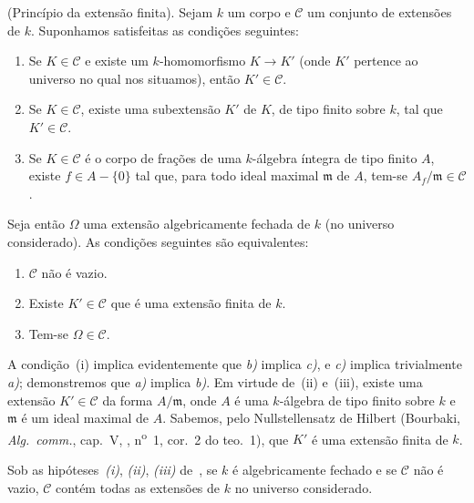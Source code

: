 \begin{proposition}[9.1.1]
\label{IV.9.1.1}
\textnormal{(Princípio da extensão finita).}
Sejam $k$ um corpo e $\mathcal{C}$ um conjunto de extensões de $k$.
Suponhamos satisfeitas as condições seguintes:
\begin{enumerate}[label=(\roman*)]
  \item Se $K\in\mathcal{C}$ e existe um $k$-homomorfismo $K\to K'$ (onde $K'$ pertence ao universo no qual nos situamos), então $K'\in\mathcal{C}$.
  \item Se $K\in\mathcal{C}$, existe uma subextensão $K'$ de $K$, de tipo finito sobre $k$, tal que $K'\in\mathcal{C}$.
  \item Se $K\in\mathcal{C}$ é o corpo de frações de uma $k$-álgebra íntegra de tipo finito $A$, existe $f\in A-\{0\}$ tal que, para todo ideal maximal $\mathfrak{m}$ de $A$, tem-se $A_f/\mathfrak{m}\in\mathcal{C}$.
\end{enumerate}


Seja então $\Omega$ uma extensão algebricamente fechada de $k$ (no universo considerado).
As condições seguintes são equivalentes:
\begin{enumerate}[label=\emph{\alph*)}]
  \item $\mathcal{C}$ não é vazio.
  \item Existe $K'\in\mathcal{C}$ que é uma extensão finita de $k$.
  \item Tem-se $\Omega\in\mathcal{C}$.
\end{enumerate}
\end{proposition}

A condição~(i) implica evidentemente que \emph{b)} implica \emph{c)}, e \emph{c)} implica trivialmente \emph{a)};
demonstremos que \emph{a)} implica \emph{b)}.
Em virtude de~(ii) e~(iii), existe uma extensão $K'\in\mathcal{C}$ da forma $A/\mathfrak{m}$, onde $A$ é uma $k$-álgebra de tipo finito sobre $k$ e $\mathfrak{m}$ é um ideal maximal de $A$.
Sabemos, pelo Nullstellensatz de Hilbert (Bourbaki, \emph{Alg.\ comm.}, cap.~V, , n\textsuperscript{o}~1, cor.~2 do teo.~1), que $K'$ é uma extensão finita de $k$.

\begin{corollary}[9.1.2]
\label{IV.9.1.2}
Sob as hipóteses~\emph{(i)}, \emph{(ii)}, \emph{(iii)} de~, se $k$ é algebricamente fechado e se $\mathcal{C}$ não é vazio, $\mathcal{C}$ contém todas as extensões de $k$ no universo considerado.
\end{corollary}

